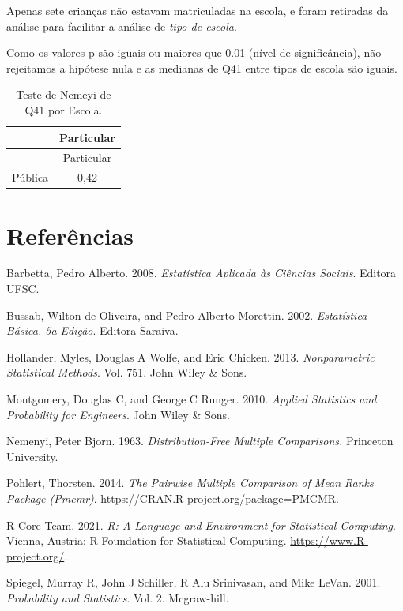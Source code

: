 \documentclass[]{article}
\begin{document}
Apenas sete crianças não estavam matriculadas na escola, e foram retiradas da análise para facilitar a análise de \emph{tipo de escola}.

Como os valores-p são iguais ou maiores que 0.01 (nível de significância), não rejeitamos a hipótese nula e as medianas de Q41 entre tipos de escola são iguais.

\begin{longtable}[]{@{}lc@{}}
\caption{\label{tab:unnamed-chunk-1654}Teste de Nemeyi de Q41 por Escola.}\tabularnewline
\toprule
& Particular\tabularnewline
\midrule
\endfirsthead
\toprule
& Particular\tabularnewline
\midrule
\endhead
Pública & 0,42\tabularnewline
\bottomrule
\end{longtable}

\cleardoublepage

\cleardoublepage

\hypertarget{referuxeancias}{%
\section*{Referências}\label{referuxeancias}}

\hypertarget{refs}{}
\leavevmode\hypertarget{ref-barbetta2008estatistica}{}%
Barbetta, Pedro Alberto. 2008. \emph{Estatística Aplicada às Ciências Sociais}. Editora UFSC.

\leavevmode\hypertarget{ref-bussab2002estatistica}{}%
Bussab, Wilton de Oliveira, and Pedro Alberto Morettin. 2002. \emph{Estatística Básica. 5a Edição}. Editora Saraiva.

\leavevmode\hypertarget{ref-hollander2013nonparametric}{}%
Hollander, Myles, Douglas A Wolfe, and Eric Chicken. 2013. \emph{Nonparametric Statistical Methods}. Vol. 751. John Wiley \& Sons.

\leavevmode\hypertarget{ref-montgomery2010applied}{}%
Montgomery, Douglas C, and George C Runger. 2010. \emph{Applied Statistics and Probability for Engineers}. John Wiley \& Sons.

\leavevmode\hypertarget{ref-nemenyi1963distribution}{}%
Nemenyi, Peter Bjorn. 1963. \emph{Distribution-Free Multiple Comparisons.} Princeton University.

\leavevmode\hypertarget{ref-PMCMR}{}%
Pohlert, Thorsten. 2014. \emph{The Pairwise Multiple Comparison of Mean Ranks Package (Pmcmr)}. \url{https://CRAN.R-project.org/package=PMCMR}.

\leavevmode\hypertarget{ref-Rlang}{}%
R Core Team. 2021. \emph{R: A Language and Environment for Statistical Computing}. Vienna, Austria: R Foundation for Statistical Computing. \url{https://www.R-project.org/}.

\leavevmode\hypertarget{ref-spiegel2001probability}{}%
Spiegel, Murray R, John J Schiller, R Alu Srinivasan, and Mike LeVan. 2001. \emph{Probability and Statistics}. Vol. 2. Mcgraw-hill.
\end{document}

